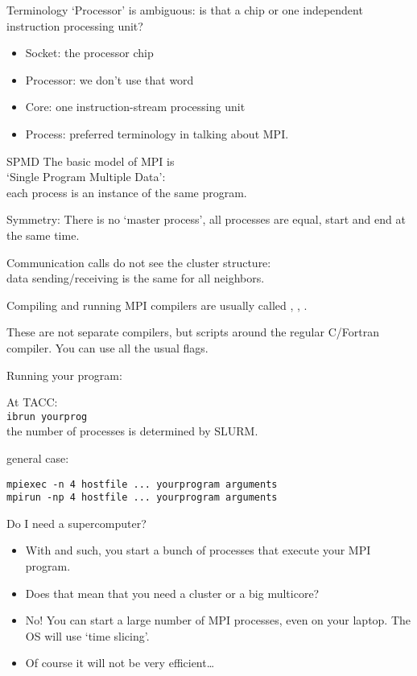 \begin{numberedframe}{Terminology}
  `Processor' is ambiguous: is that a chip or one independent
  instruction processing unit?
  \begin{itemize}
  \item Socket: the processor chip
  \item Processor: we don't use that word
  \item Core: one instruction-stream processing unit
  \item Process: preferred terminology in talking about MPI.
  \end{itemize}  
\end{numberedframe}

\begin{numberedframe}{SPMD}
  The basic model of MPI is\\
  `Single Program Multiple Data':\\
  each process is an instance of the same program.

  Symmetry: There is no `master process', all processes are equal,
  start and end
  at the same time.

  Communication calls do not see the cluster structure:\\
  data sending/receiving is the same for all neighbors.
\end{numberedframe}


\begin{numberedframe}{Compiling and running}
  MPI compilers are usually called ,
  , .

  These are not separate compilers,
  but scripts around the regular C/Fortran compiler. You can use all
  the usual flags.

  Running your program:
\begin{tacc}
  At TACC:\\
  \verb+ibrun yourprog+\\
  the number of processes is determined by SLURM.
\end{tacc}
general case:
\begin{verbatim}
mpiexec -n 4 hostfile ... yourprogram arguments
mpirun -np 4 hostfile ... yourprogram arguments
\end{verbatim}
\end{numberedframe}

\begin{numberedframe}{Do I need a supercomputer?}
  \begin{itemize}
  \item With  and such, you start a bunch of processes that
    execute your MPI program.
  \item Does that mean that you need a cluster or a big multicore?
  \item No! You can start a large number of MPI processes, even on
    your laptop. The OS will use `time slicing'.
  \item Of course it will not be very efficient\ldots
  \end{itemize}
\end{numberedframe}

